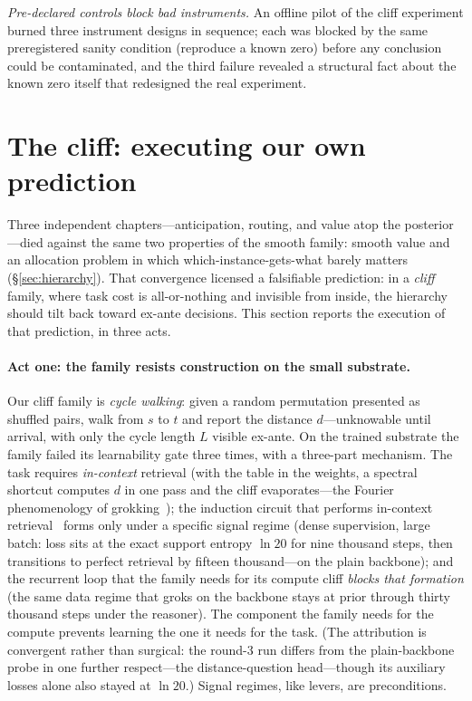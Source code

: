 \documentclass{article}
\begin{document}
\emph{Pre-declared controls block bad instruments.} An offline pilot of the
cliff experiment burned three instrument designs in sequence; each was
blocked by the same preregistered sanity condition (reproduce a known zero)
before any conclusion could be contaminated, and the third failure revealed
a structural fact about the known zero itself that redesigned the real
experiment.

\section{The cliff: executing our own prediction}\label{sec:cliff}

Three independent chapters---anticipation, routing, and value atop the
posterior---died against the same two properties of the smooth family:
smooth value and an allocation problem in which which-instance-gets-what
barely matters (\S\ref{sec:hierarchy}). That convergence licensed a
falsifiable prediction: in a \emph{cliff} family, where task cost is
all-or-nothing and invisible from inside, the hierarchy should tilt back
toward ex-ante decisions. This section reports the execution of that
prediction, in three acts.

\paragraph{Act one: the family resists construction on the small substrate.}
Our cliff family is \emph{cycle walking}: given a random permutation
presented as shuffled pairs, walk from $s$ to $t$ and report the distance
$d$---unknowable until arrival, with only the cycle length $L$ visible
ex-ante. On the trained substrate the family failed its learnability gate
three times, with a three-part mechanism. The task requires \emph{in-context}
retrieval (with the table in the weights, a spectral shortcut computes $d$
in one pass and the cliff evaporates---the Fourier phenomenology of
grokking~\citep{power2022grokking,nanda2023progress}); the induction circuit
that performs in-context retrieval~\citep{olsson2022induction} forms only
under a specific signal regime (dense supervision, large batch: loss sits
at the exact support entropy $\ln 20$ for nine thousand steps, then
transitions to perfect retrieval by fifteen thousand---on the plain
backbone); and the recurrent loop that the family needs for its compute
cliff \emph{blocks that formation} (the same data regime that groks on the
backbone stays at prior through thirty thousand steps under the reasoner).
The component the family needs for the compute prevents learning the one it
needs for the task. (The attribution is convergent rather than surgical:
the round-3 run differs from the plain-backbone probe in one further
respect---the distance-question head---though its auxiliary losses alone
also stayed at $\ln 20$.) Signal regimes, like levers, are preconditions.
\end{document}
